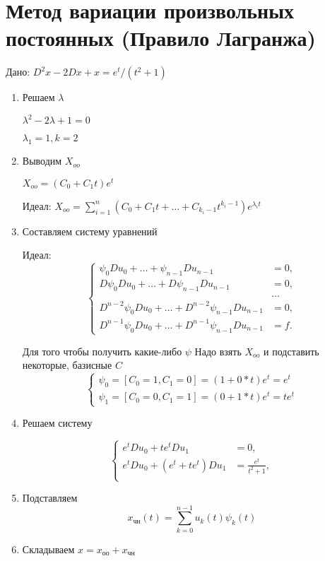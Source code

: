 \documentclass[a4paper, 12pt]{article}
\begin{document}
\section{Метод вариации произвольных постоянных (Правило Лагранжа)}
Дано: $D^2x-2Dx+x=e^t/(t^2+1)$
\begin{enumerate}
    \item Решаем $\lambda$

    $\lambda^2-2\lambda+1=0$
    
    $\lambda_1=1,k=2$
    \item Выводим $X_{oo}$
    
    $X_{oo}=(C_0+C_{1}t)e^{t}$

    Идеал: $X_{oo}=\sum_{i=1}^{n}(C_0+C_1t+\dots+C_{k_{i}-1}t^{k_i-1})e^{\lambda_i t}$

    \item Составляем систему уравнений
    
    Идеал: 
    \[
\left\{
\begin{aligned}
    \psi_0 D u_0 + \dots + \psi_{n-1} D u_{n-1} &= 0, \\
    D \psi_0 D u_0 + \dots + D \psi_{n-1} D u_{n-1} &= 0, \\
    & \dots \\
    D^{n-2} \psi_0 D u_0 + \dots + D^{n-2} \psi_{n-1} D u_{n-1} &= 0, \\
    D^{n-1} \psi_0 D u_0 + \dots + D^{n-1} \psi_{n-1} D u_{n-1} &= f.
\end{aligned}
\right.
\]

Для того чтобы получить какие-либо $\psi$ Надо взять $X_{oo}$ и подставить некоторые, базисные $C$
\[
\left\{
\begin{aligned}
    \psi_0 = [C_0 = 1, C_1 = 0] = (1+0*t)e^{t} =  e^{t} \\
    \psi_1 = [C_0 = 0, C_1 = 1] = (0+1*t)e^{t} = te^{t}
\end{aligned}
\right.
\]
    \item Решаем систему
    
\[
\left\{
\begin{aligned}
    e^{t} D u_0 + te^{t} D u_{1} &= 0, \\
    e^{t} D u_0 + (e^{t}+te^{t}) D u_{1} &= \frac{e^{t}}{t^2+1}, \\
\end{aligned}
\right.
\]    

    \item Подставляем
    $$x_{\text{чн}}(t) = \sum_{k=0}^{n-1} u_k(t) \psi_k(t)$$
    \item Складываем
    $x=x_{\text{оо}}+x_{\text{чн}}$
\end{enumerate}
\newpage
\end{document}
